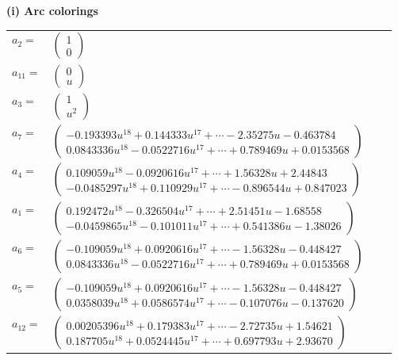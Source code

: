 \documentclass[1p]{elsarticle_modified}
\theoremstyle{definition}
\begin{document}
\flushleft \textbf{(i) Arc colorings}\\
\begin{tabular}{m{7pt} m{180pt} m{7pt} m{180pt} }
\flushright $a_{2}=$&$\begin{pmatrix}1\\0\end{pmatrix}$ \\
\flushright $a_{11}=$&$\begin{pmatrix}0\\u\end{pmatrix}$ \\
\flushright $a_{3}=$&$\begin{pmatrix}1\\u^2\end{pmatrix}$ \\
\flushright $a_{7}=$&$\begin{pmatrix}-0.193393 u^{18}+0.144333 u^{17}+\cdots-2.35275 u-0.463784\\0.0843336 u^{18}-0.0522716 u^{17}+\cdots+0.789469 u+0.0153568\end{pmatrix}$ \\
\flushright $a_{4}=$&$\begin{pmatrix}0.109059 u^{18}-0.0920616 u^{17}+\cdots+1.56328 u+2.44843\\-0.0485297 u^{18}+0.110929 u^{17}+\cdots-0.896544 u+0.847023\end{pmatrix}$ \\
\flushright $a_{1}=$&$\begin{pmatrix}0.192472 u^{18}-0.326504 u^{17}+\cdots+2.51451 u-1.68558\\-0.0459865 u^{18}-0.101011 u^{17}+\cdots+0.541386 u-1.38026\end{pmatrix}$ \\
\flushright $a_{6}=$&$\begin{pmatrix}-0.109059 u^{18}+0.0920616 u^{17}+\cdots-1.56328 u-0.448427\\0.0843336 u^{18}-0.0522716 u^{17}+\cdots+0.789469 u+0.0153568\end{pmatrix}$ \\
\flushright $a_{5}=$&$\begin{pmatrix}-0.109059 u^{18}+0.0920616 u^{17}+\cdots-1.56328 u-0.448427\\0.0358039 u^{18}+0.0586574 u^{17}+\cdots-0.107076 u-0.137620\end{pmatrix}$ \\
\flushright $a_{12}=$&$\begin{pmatrix}0.00205396 u^{18}+0.179383 u^{17}+\cdots-2.72735 u+1.54621\\0.187705 u^{18}+0.0524445 u^{17}+\cdots+0.697793 u+2.93670\end{pmatrix}$ \\

\end{tabular}
\end{document}
